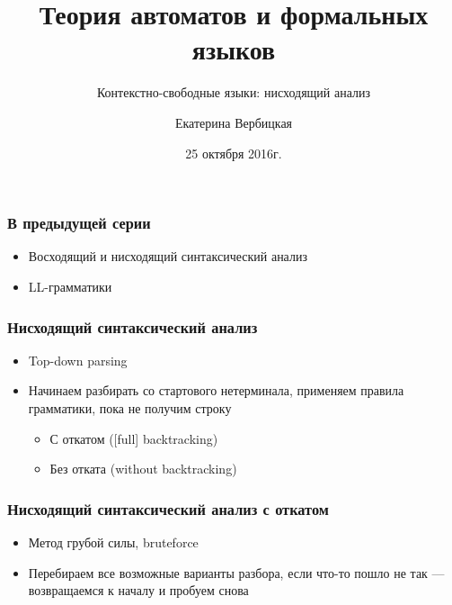 \documentclass{beamer}
\title[]{Теория автоматов и формальных языков}
\subtitle[]{Контекстно-свободные языки: нисходящий анализ}
\institute[]{
Санкт-Петербургский государственный электротехнический университет <<ЛЭТИ>>\\
}
\author[]{Екатерина Вербицкая}
\date{25 октября 2016г.}
\begin{document}
{
  \begin{frame}
    \titlepage
  \end{frame}
}


\begin{frame}[fragile]
  \transwipe[direction=90]
  \frametitle{В предыдущей серии}
  \begin{itemize}
    \item Восходящий и нисходящий синтаксический анализ
    \item LL-грамматики
  \end{itemize}
\end{frame}

\begin{frame}[fragile]
  \transwipe[direction=90]
  \frametitle{Нисходящий синтаксический анализ}
  \begin{itemize}
    \item Top-down parsing
    \item Начинаем разбирать со стартового нетерминала, применяем правила грамматики, пока не получим строку
    \begin{itemize}
      \item С откатом ([full] backtracking)
      \item Без отката (without backtracking)
    \end{itemize}
  \end{itemize}
\end{frame}

\begin{frame}[fragile]
  \transwipe[direction=90]
  \frametitle{Нисходящий синтаксический анализ с откатом}
  \begin{itemize}
    \item Метод грубой силы, bruteforce
    \item Перебираем все возможные варианты разбора, если что-то пошло не так --- возвращаемся к началу и пробуем снова
  \end{itemize}
\end{frame}  
\end{document}
